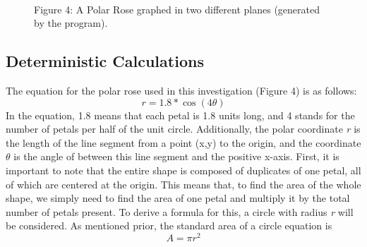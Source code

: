 \documentclass[11pt]{article}
\begin{document}
\begin{figure}[h]%
    \centering
    \qquad
    \\[3ex]%
    \footnotesize{Figure 4: A Polar Rose graphed in two different planes (generated by the program).}%
    \label{fig:example}%
\end{figure}
\newpage
\subsection{Deterministic Calculations}
The equation for the polar rose used in this investigation (Figure 4) is as follows:\\[-3ex]
\[r=1.8*\cos(4\theta)\]
In the equation, 1.8 means that each petal is 1.8 units long, and 4 stands for the number of petals per half of the unit circle. Additionally, the polar coordinate \emph{r} is the length of the line segment from a point (x,y) to the origin, and the coordinate $\theta$ is the angle of between this line segment and the positive x-axis. First, it is important to note that the entire shape is composed of duplicates of one petal, all of which are centered at the origin. This means that, to find the area of the whole shape, we simply need to find the area of one petal and multiply it by the total number of petals present. To derive a formula for this, a circle with radius \emph{r} will be considered. As mentioned prior, the standard area of a circle equation is\\[-2ex]
\[A=\pi r^2\]
\end{document}
